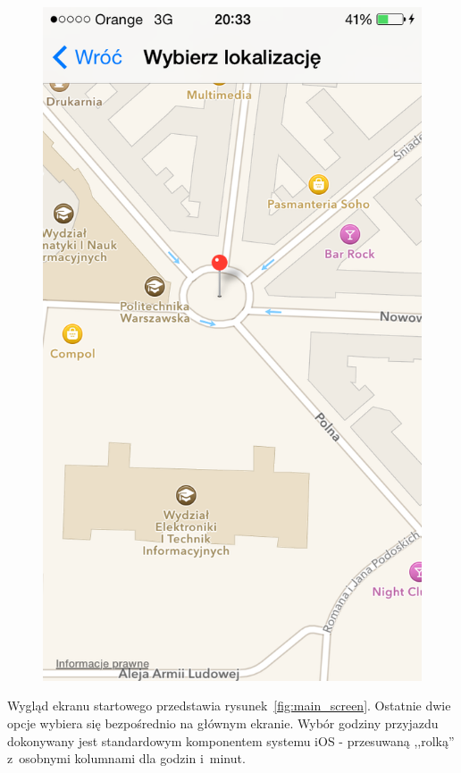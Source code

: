 \documentclass[a4paper,12pt]{article}
\begin{document}
\begin{figure}[ht!]
\begin{minipage}{.45\textwidth}
  			\includegraphics[width=\linewidth, height=.4\textheight,keepaspectratio]{graphics/snapshots/location_selection.png}
  			\label{fig:location_selection}
		\end{minipage}
	\end{figure}

	Wygląd ekranu startowego przedstawia rysunek~\ref{fig:main_screen}. Ostatnie dwie opcje wybiera się bezpośrednio na głównym ekranie. Wybór godziny przyjazdu dokonywany jest standardowym komponentem systemu iOS - przesuwaną ,,rolką'' z~osobnymi kolumnami dla godzin i~minut.
\end{document}
